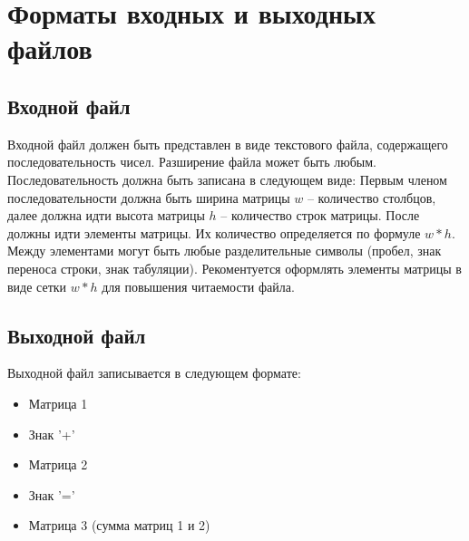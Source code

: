 \section*{Форматы входных и выходных файлов}

\subsection*{Входной файл}

Входной файл должен быть представлен в виде текстового файла, содержащего последовательность чисел.
Разширение файла может быть любым.
Последовательность должна быть записана в следующем виде:
Первым членом последовательности должна быть ширина матрицы $ w $ -- количество столбцов,
далее должна идти высота матрицы $ h $ -- количество строк матрицы.
После должны идти элементы матрицы.
Их количество определяется по формуле $ w*h $.
Между элементами могут быть любые разделительные символы
(пробел, знак переноса строки, знак табуляции).
Рекоментуется оформлять элементы
матрицы в виде сетки $ w*h $ для повышения читаемости файла.

\subsection*{Выходной файл}

Выходной файл записывается в следующем формате:

\begin{itemize}
	\item Матрица 1
	\item Знак '+'
	\item Матрица 2
	\item Знак '='
	\item Матрица 3 (сумма матриц 1 и 2)
\end{itemize}